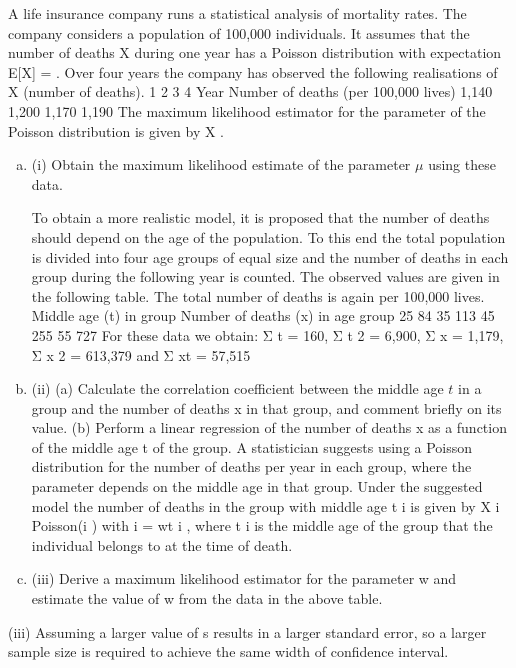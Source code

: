 \documentclass[a4paper,12pt]{article}
\begin{document}
 A life insurance company runs a statistical analysis of mortality rates. The company considers a population of 100,000 individuals. It assumes that the number of deaths X during one year has a Poisson distribution with expectation E[X] = \mu. Over four years
the company has observed the following realisations of X (number of deaths).
1
2
3
4
Year
Number of deaths (per 100,000 lives) 1,140 1,200 1,170 1,190
The maximum likelihood estimator for the parameter \mu of the Poisson distribution is
given by X .
\begin{enumerate}[(a)]
\item
(i)
Obtain the maximum likelihood estimate of the parameter $\mu$ using these data.

To obtain a more realistic model, it is proposed that the number of deaths should depend on the age of the population. To this end the total population is divided into four age groups of equal size and the number of deaths in each group during the
following year is counted. The observed values are given in the following table. The
total number of deaths is again per 100,000 lives.
Middle age (t) in group
Number of deaths (x) in age group
25
84
35
113
45
255
55
727
For these data we obtain: Σ t = 160, Σ t 2 = 6,900, Σ x = 1,179, Σ x 2 = 613,379 and
Σ xt = 57,515
\item 
(ii)
(a) Calculate the correlation coefficient between the middle age $t$ in a group and the number of deaths x in that group, and comment briefly on its value.
(b) Perform a linear regression of the number of deaths x as a function of the middle age t of the group.
A statistician suggests using a Poisson distribution for the number of deaths per year in each group, where the parameter \mu depends on the middle age in that group. Under the suggested model the number of deaths in the group with middle age t i is given by X i ~ Poisson(\mu i ) with \mu i = wt i , where t i is the middle age of the group that the individual belongs to at the time of death.
\item 
(iii)
Derive a maximum likelihood estimator for the parameter w and estimate the value of w from the data in the above table.
\end{enumerate}

(iii) Assuming a larger value of s results in a larger standard error, so a larger sample size is required to achieve the same width of confidence interval.
\end{document}
